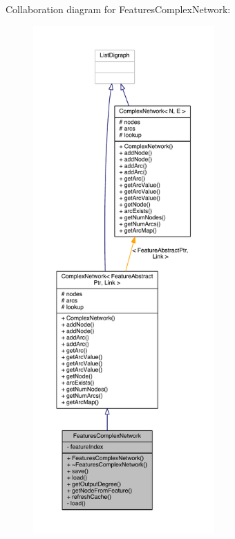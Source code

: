 Collaboration diagram for Features\+Complex\+Network\+:
\nopagebreak
\begin{figure}[H]
\begin{center}
\leavevmode
\includegraphics[height=550pt]{class_features_complex_network__coll__graph}
\end{center}
\end{figure}


